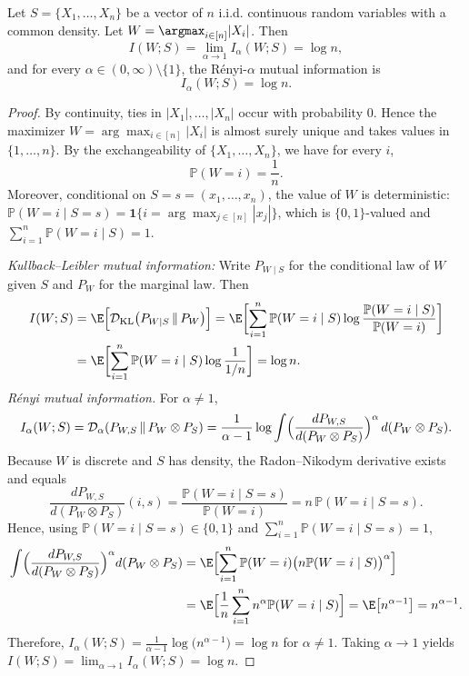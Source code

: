 \documentclass[11pt]{article}
\providecommand{\DD}{\mathcal{D}}
\renewcommand{\paragraph}[1]{\noindent\textit{#1}}
\begin{document}
\begin{example}\label{Max}
Let $S= \{X_1, \ldots, X_n\}$ be a vector of $n$ i.i.d. continuous random
variables with a common density. Let
$
W = \argmax_{i \in [n]} |X_i|$. Then
\[
I(W;S)=\lim_{\alpha \to 1} I_\alpha (W;S) =\log n,
\]
and for every $\alpha \in (0, \infty) \setminus \{1\}$, the R\'enyi-$\alpha$
mutual information is
\[
    I_\alpha(W; S) = \log n.
\]
\end{example}
\begin{proof}
By continuity, ties in $|X_1|,\ldots,|X_n|$ occur with probability $0$.
Hence the maximizer
$W=\arg\max_{i\in [n]} |X_i|$
is almost surely unique and takes values in $\{1,\ldots,n\}$. By the
exchangeability of $\{X_1,\ldots,X_n\}$, we have for every $i$,
\[
\mathbb{P}(W=i)=\frac{1}{n}.
\]
Moreover, conditional on $S=s=(x_1,\ldots,x_n)$, the value of $W$ is deterministic:
$\mathbb{P}(W=i\mid S=s)=\mathbf{1}\{i=\arg\max_{j\in [n]} |x_j|\}$, which
is $\{0,1\}$-valued and
$\sum_{i=1}^n \mathbb{P}(W=i\mid S)=1$.

\paragraph{Kullback--Leibler mutual information:}
Write $P_{W\mid S}$ for the conditional law of $W$ given $S$ and $P_W$ for the marginal law. Then
\[
\begin{aligned}
I(W;S)&=\E\Bigl[ \DD_{\mathrm{KL}}\bigl(P_{W\mid S}\,\|\,P_W\bigr)\Bigr]
      =\E\biggl[\sum_{i=1}^n \mathbb{P}(W=i\mid S)\log\frac{\mathbb{P}(W=i\mid S)}{\mathbb{P}(W=i)}\biggr]\\
      &=\E\biggl[\sum_{i=1}^n \mathbb{P}(W=i\mid S)\log\frac{1}{1/n}\biggr]=\log n.
\end{aligned}
\]
\paragraph{R\'enyi mutual information.}
For $\alpha\neq 1$, 
\[
I_\alpha(W;S)=\DD_\alpha(P_{W,S}\,\|\,P_W\otimes P_S)
=\frac{1}{\alpha-1}\log \int \Bigl(\frac{dP_{W,S}}{d(P_W\otimes P_S)}\Bigr)^\alpha \, d(P_W\otimes P_S).
\]
Because $W$ is discrete and $S$ has density, the Radon--Nikodym derivative exists and equals
\[
\frac{dP_{W,S}}{d(P_W\otimes P_S)}(i,s)=\frac{\mathbb{P}(W=i\mid S=s)}{\mathbb{P}(W=i)}
= n\,\mathbb{P}(W=i\mid S=s).
\]
Hence, using $\mathbb{P}(W=i\mid S=s)\in\{0,1\}$ and $\sum_{i=1}^n \mathbb{P}(W=i\mid S=s)=1$,
\begin{align}\label{eq:p-moment}
\int \Bigl(\frac{dP_{W,S}}{d(P_W\otimes P_S)}\Bigr)^\alpha d(P_W\otimes P_S)
&=\E\Bigl[\sum_{i=1}^n \mathbb{P}(W=i)\bigl(n\mathbb{P}(W=i\mid S)\bigr)^\alpha\Bigr]\nonumber\\
&=\E\Bigl[\frac{1}{n}\sum_{i=1}^n n^\alpha \mathbb{P}(W=i\mid S)\Bigr]=\E\bigl[n^{\alpha-1}\bigr]
= n^{\alpha-1}.
\end{align}
Therefore, $I_\alpha(W;S)=\frac{1}{\alpha-1}\log\bigl(n^{\alpha-1}\bigr)=\log n$ for $\alpha\neq 1$. Taking $\alpha\to 1$ yields $I(W;S)=\lim_{\alpha\to 1} I_\alpha(W;S)=\log n$.
\end{proof}
\end{document}
